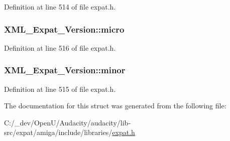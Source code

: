Definition at line 514 of file expat.\+h.

\subsubsection[{\texorpdfstring{micro}{micro}}]{ X\+M\+L\+\_\+\+Expat\+\_\+\+Version\+::micro}\hypertarget{struct_x_m_l___expat___version_ac6b159560f37010366faaf9531f74929}{}\label{struct_x_m_l___expat___version_ac6b159560f37010366faaf9531f74929}


Definition at line 516 of file expat.\+h.

\subsubsection[{\texorpdfstring{minor}{minor}}]{ X\+M\+L\+\_\+\+Expat\+\_\+\+Version\+::minor}\hypertarget{struct_x_m_l___expat___version_ab9b1e025090b5f4e7c8f206c72aeb8b6}{}\label{struct_x_m_l___expat___version_ab9b1e025090b5f4e7c8f206c72aeb8b6}


Definition at line 515 of file expat.\+h.



The documentation for this struct was generated from the following file\+:\begin{DoxyCompactItemize}
\item 
C\+:/\+\_\+dev/\+Open\+U/\+Audacity/audacity/lib-\/src/expat/amiga/include/libraries/\hyperlink{amiga_2include_2libraries_2expat_8h}{expat.\+h}\end{DoxyCompactItemize}
